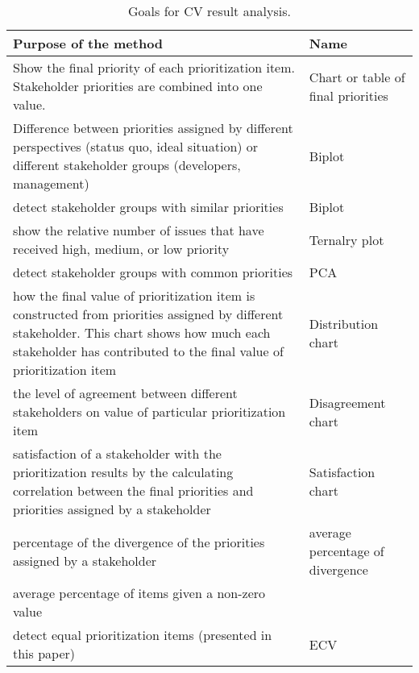 \begin{table}
\caption{Goals for CV result analysis.}
\label{goals_for_methods}

\begin{tabular}{|>{\raggedright}p{}|>{\raggedright}p{}|}
\hline 
Purpose of the method & Name\tabularnewline
\hline

Show the final priority of each prioritization item. Stakeholder priorities
are combined into one value. & 
Chart or table of final priorities\tabularnewline
\hline 

Difference between priorities assigned by different perspectives (status
quo, ideal situation) or different stakeholder groups (developers,
management) \citep{Chatzipetrou2010}& 
Biplot \tabularnewline
\hline 

detect stakeholder groups with similar priorities \citep{Chatzipetrou2010}& Biplot \tabularnewline
\hline 

show the relative number of issues that have received high, medium,
or low priority \citep{Chatzipetrou2010}& Ternalry plot \tabularnewline
\hline 

detect stakeholder groups with common priorities \citep{Chatzipetrou2010}& PCA \tabularnewline
\hline 

how the final value of prioritization item is constructed from priorities
assigned by different stakeholder. This chart shows how much each
stakeholder has contributed to the final value of prioritization item \citep{Regnell2000}& Distribution chart  \tabularnewline
\hline 

the level of agreement between different stakeholders on value of
particular prioritization item \citep{Regnell2000} & 
Disagreement chart  \tabularnewline
\hline 

satisfaction of a stakeholder with the prioritization results by the
calculating correlation between the final priorities and priorities
assigned by a stakeholder \citep{Regnell2000}& 
Satisfaction chart\tabularnewline
\hline 

percentage of the divergence of the priorities assigned by a stakeholder \citep{Berander2006a} & 
average percentage of divergence\tabularnewline
\hline 
average percentage of items given a non-zero value \citep{Berander2006a} & \tabularnewline
\hline 

detect equal prioritization items (presented in this paper)& 
ECV \tabularnewline
\hline
\end{tabular}
\end{table}

